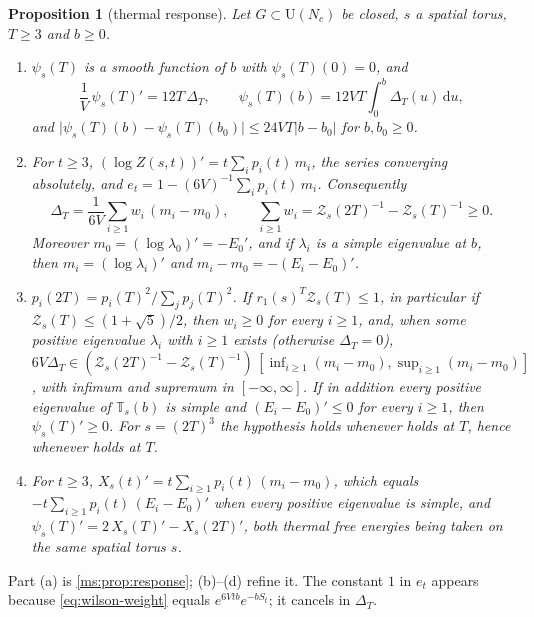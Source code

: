 \documentclass[11pt,a4paper]{amsart}
\newtheorem{proposition}[theorem]{Proposition}
\theoremstyle{definition}
\theoremstyle{remark}
\numberwithin{equation}{section}
\newcommand{\abs}[1]{\lvert #1\rvert}      %
\newcommand{\dd}{\,\mathrm{d}}             %
\newcommand{\U}{\mathrm{U}}                %
\newcommand{\TT}{\mathbb{T}}               %
\newcommand{\Zpart}[2]{Z(#1,#2)}           %
\newcommand{\Zc}{\mathcal{Z}}              %
\newcommand{\Zs}[2]{\Zc_{#1}(#2)}          %
\newcommand{\XT}[2]{X_{#1}(#2)}            %
\newcommand{\psiT}[2]{\psi_{#1}(#2)}       %
\newcommand{\cube}[1]{(2#1)^3}             %
\newcommand{\lzero}{\lambda_0}             %
\newcommand{\Mcirc}{\text{\upshape(M$^{\circ}$)}}   %
\newcommand{\Bcirc}{\text{\upshape(B$^{\circ}$)}}   %
\begin{document}
\begin{proposition}[thermal response]\label{prop:thermal-response}
Let $G\subset\U(N_c)$ be closed, $s$ a spatial torus, $T\ge3$ and $b\ge0$.
\begin{enumerate}[label=(\alph*)]
\item $\psiT{s}{T}$ is a smooth function of $b$ with $\psiT{s}{T}(0)=0$, and
\begin{equation}\label{eq:response-identity}
\frac1V\,\psiT{s}{T}'=12T\,\Delta_T,\qquad \psiT{s}{T}(b)=12VT\int_0^b\Delta_T(u)\dd u,
\end{equation}
and $\abs{\psiT{s}{T}(b)-\psiT{s}{T}(b_0)}\le24VT\abs{b-b_0}$ for $b,b_0\ge0$.
\item For $t\ge3$, $(\log\Zpart{s}{t})'=t\sum_ip_i(t)\,m_i$, the series converging absolutely, and $e_t=1-(6V)^{-1}\sum_ip_i(t)\,m_i$. Consequently
\begin{equation}\label{eq:response-spectral}
\Delta_T=\frac{1}{6V}\sum_{i\ge1}w_i\,(m_i-m_0),\qquad \sum_{i\ge1}w_i=\Zs{s}{2T}^{-1}-\Zs{s}{T}^{-1}\ge0 .
\end{equation}
Moreover $m_0=(\log\lzero)'=-E_0'$, and if $\lambda_i$ is a simple eigenvalue at $b$, then $m_i=(\log\lambda_i)'$ and $m_i-m_0=-(E_i-E_0)'$.
\item $p_i(2T)=p_i(T)^2/\sum_jp_j(T)^2$. If $r_1(s)^T\Zs{s}{T}\le1$, in particular if $\Zs{s}{T}\le(1+\sqrt5)/2$, then $w_i\ge0$ for every $i\ge1$, and, when some positive eigenvalue $\lambda_i$ with $i\ge1$ exists (otherwise $\Delta_T=0$), $6V\Delta_T\in(\Zs{s}{2T}^{-1}-\Zs{s}{T}^{-1})\,[\inf_{i\ge1}(m_i-m_0),\sup_{i\ge1}(m_i-m_0)]$, with infimum and supremum in $[-\infty,\infty]$. If in addition every positive eigenvalue of $\TT_s(b)$ is simple and $(E_i-E_0)'\le0$ for every $i\ge1$, then $\psiT{s}{T}'\ge0$. For $s=\cube{T}$ the hypothesis holds whenever \Bcirc{} holds at $T$, hence whenever \Mcirc{} holds at $T$.
\item For $t\ge3$, $\XT{s}{t}'=t\sum_{i\ge1}p_i(t)\,(m_i-m_0)$, which equals $-t\sum_{i\ge1}p_i(t)\,(E_i-E_0)'$ when every positive eigenvalue is simple, and $\psiT{s}{T}'=2\,\XT{s}{T}'-\XT{s}{2T}'$, both thermal free energies being taken on the same spatial torus $s$.
\end{enumerate}
\end{proposition}

Part (a) is \cref{ms:prop:response}; (b)--(d) refine it. The constant $1$ in $e_t$ appears because \eqref{eq:wilson-weight} equals $e^{6Vtb}e^{-bS_t}$; it cancels in $\Delta_T$.
\end{document}
